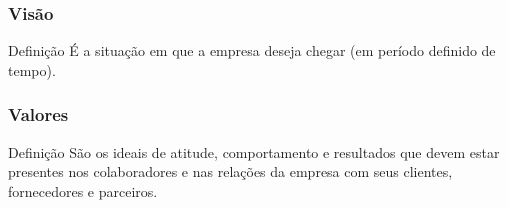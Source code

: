\documentclass[aspectratio=169]{beamer}
\begin{document}
\begin{frame}
	\frametitle{Visão}

	\begin{block}{Defini\c cão}
		É a situação em que a empresa deseja chegar (em período definido de tempo).
	\end{block}
\end{frame}

\begin{frame}
	\frametitle{Valores}

	\begin{block}{Defini\c cão}
		São os ideais de atitude, comportamento e resultados que devem estar presentes nos colaboradores e nas relações da empresa com seus clientes, fornecedores e parceiros.
	\end{block}
\end{frame}
\end{document}
